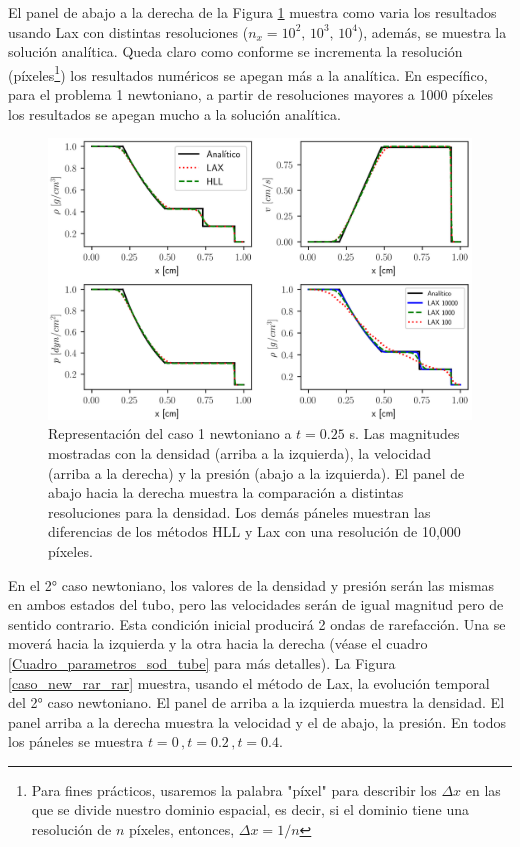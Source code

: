 \documentclass[12pt,a4paper]{book}
\begin{document}
El panel de abajo a la derecha de la Figura 
\ref{comparacion_analitico_newtoniano_caso_1} muestra como varia los resultados
usando Lax con distintas resoluciones ($n_x = 10^2, \, 10^3, \,10^4$), además, se muestra la solución
analítica.
Queda claro como 
conforme se incrementa la resolución (píxeles\footnote{Para fines prácticos, usaremos la palabra "píxel" para describir los $\Delta x$ en 
las que se divide nuestro dominio espacial, es decir, si el dominio tiene una resolución de $n$ 
píxeles, entonces, $\Delta x = 1/n$ }) los resultados numéricos se apegan más a la analítica. 
En específico, para el problema 1 newtoniano, a partir de resoluciones mayores a 1000 píxeles
los resultados 
se apegan mucho a la solución analítica.

\begin{figure}
  \centering
    \includegraphics[width=1.0\textwidth]{./Figuras/verificacion_del_codigo/rarefaction.png}
  \caption{Representación del caso 1 newtoniano a $t = 0.25$ s. Las magnitudes mostradas con
  la densidad (arriba a la izquierda), la velocidad (arriba a la derecha) y la presión (abajo a la 
  izquierda).
  El panel de abajo hacia la derecha muestra la comparación a distintas resoluciones para la densidad. Los demás páneles muestran
  las diferencias de los métodos HLL y Lax con una resolución de 10,000 píxeles.
  \label{comparacion_analitico_newtoniano_caso_1}}
\end{figure}

En el 2° caso newtoniano, los valores de la 
densidad y presión serán las mismas en ambos estados del tubo, pero las velocidades serán de igual magnitud
pero de sentido contrario. Esta condición inicial producirá 2 ondas de rarefacción. Una se moverá hacia
la izquierda y la otra hacia la derecha (véase el cuadro \ref{Cuadro_parametros_sod_tube} para más
detalles).
La Figura \ref{caso_new_rar_rar} muestra, usando
el método de Lax, la evolución temporal del 2° caso newtoniano. El panel de arriba a la izquierda muestra la densidad.
El panel arriba a la derecha muestra la velocidad y el de abajo, la presión. En todos los páneles se 
muestra $t = 0 \, , t = 0.2 \, ,t = 0.4$.
\end{document}
